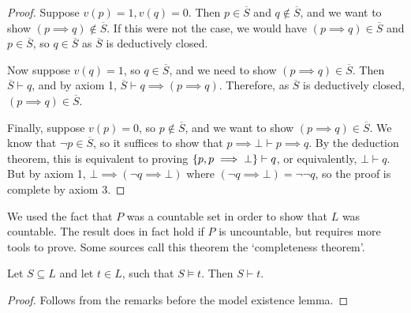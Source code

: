 \begin{proof}
    Suppose \( v(p) = 1, v(q) = 0 \).
    Then \( p \in \overline S \) and \( q \not\in \overline S \), and we want to show \( (p \implies q) \not\in \overline S \).
    If this were not the case, we would have \( (p \implies q) \in \overline S \) and \( p \in \overline S \), so \( q \in \overline S \) as \( \overline S \) is deductively closed.

    Now suppose \( v(q) = 1 \), so \( q \in \overline S \), and we need to show \( (p \implies q) \in \overline S \).
    Then \( \overline S \vdash q \), and by axiom 1, \( \overline S \vdash q \implies (p \implies q) \).
    Therefore, as \( \overline S \) is deductively closed, \( (p \implies q) \in \overline S \).

    Finally, suppose \( v(p) = 0 \), so \( p \not\in \overline S \), and we want to show \( (p \implies q) \in \overline S \).
    We know that \( \neg p \in \overline S \), so it suffices to show that \( p \implies \bot \vdash p \implies q \).
    By the deduction theorem, this is equivalent to proving \( \qty{p, p \implies \bot} \vdash q \), or equivalently, \( \bot \vdash q \).
    But by axiom 1, \( \bot \implies (\neg q \implies \bot) \) where \( (\neg q \implies \bot) = \neg\neg q \), so the proof is complete by axiom 3.
\end{proof}
\begin{remark}
    We used the fact that \( P \) was a countable set in order to show that \( L \) was countable.
    The result does in fact hold if \( P \) is uncountable, but requires more tools to prove.
    Some sources call this theorem the `completeness theorem'.
\end{remark}
\begin{corollary}[adequacy]
    Let \( S \subseteq L \) and let \( t \in L \), such that \( S \models t \).
    Then \( S \vdash t \).
\end{corollary}
\begin{proof}
    Follows from the remarks before the model existence lemma.
\end{proof}

